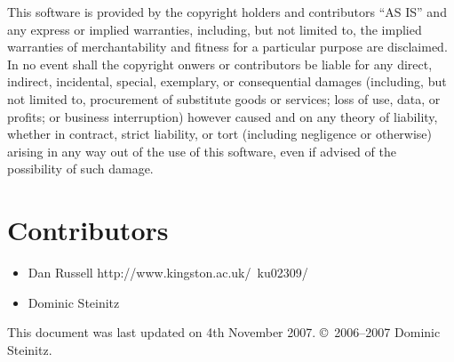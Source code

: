 \documentclass{article}
\begin{document}
\begin{sc}
This software is provided by the copyright holders and contributors ``AS IS'' 
and any express or implied warranties, including, but not limited to, 
the implied warranties of merchantability and fitness for a particular 
purpose are disclaimed. In no event shall the copyright onwers or
contributors be liable for any direct, indirect, incidental, special,
exemplary, or consequential damages (including, but not limited to,
procurement of substitute goods or services; loss of use, data, or profits;
or business interruption) however caused and on any theory of liability,
whether in contract, strict liability, or tort (including negligence or
otherwise) arising in any way out of the use of this software,
even if advised of the possibility of such damage.
\end{sc}

\section{Contributors}

\begin{itemize}

\item
\htmladdnormallinkfoot
   {Dan Russell}
   {http://www.kingston.ac.uk/~ku02309/}

\item
Dominic Steinitz

\end{itemize}

This document was last updated on 4th November 2007.
\copyright\ 2006--2007 Dominic Steinitz. 
\end{document}
